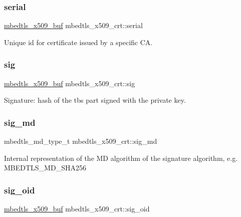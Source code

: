 \subsubsection{\texorpdfstring{serial}{serial}}
{\footnotesize\ttfamily \hyperlink{group__x509__module_ga4d02c9e8e4e2934555e0d132cd2976dc}{mbedtls\+\_\+x509\+\_\+buf} mbedtls\+\_\+x509\+\_\+crt\+::serial}

Unique id for certificate issued by a specific CA. \mbox{\label{structmbedtls__x509__crt_aea76ebaa8c8e23129bd905cdc0242a3a}} 
\subsubsection{\texorpdfstring{sig}{sig}}
{\footnotesize\ttfamily \hyperlink{group__x509__module_ga4d02c9e8e4e2934555e0d132cd2976dc}{mbedtls\+\_\+x509\+\_\+buf} mbedtls\+\_\+x509\+\_\+crt\+::sig}

Signature\+: hash of the tbs part signed with the private key. \mbox{\label{structmbedtls__x509__crt_a5c56937aaf2a51a1d8bc814b142734ca}} 
\subsubsection{\texorpdfstring{sig\+\_\+md}{sig\_md}}
{\footnotesize\ttfamily mbedtls\+\_\+md\+\_\+type\+\_\+t mbedtls\+\_\+x509\+\_\+crt\+::sig\+\_\+md}

Internal representation of the MD algorithm of the signature algorithm, e.\+g. M\+B\+E\+D\+T\+L\+S\+\_\+\+M\+D\+\_\+\+S\+H\+A256 \mbox{\label{structmbedtls__x509__crt_a128c3a665ffdce696b402435a74e97aa}} 
\subsubsection{\texorpdfstring{sig\+\_\+oid}{sig\_oid}}
{\footnotesize\ttfamily \hyperlink{group__x509__module_ga4d02c9e8e4e2934555e0d132cd2976dc}{mbedtls\+\_\+x509\+\_\+buf} mbedtls\+\_\+x509\+\_\+crt\+::sig\+\_\+oid}

